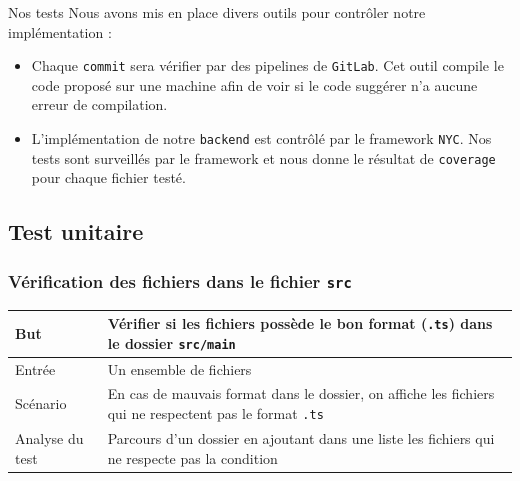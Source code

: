 \newenvironment{mytest}[4]
{
    \begin{center}
        \centering
        \begin{tabular}[h]{|m{4cm}|m{12cm}|}
            \hline
            \rowcolor[HTML]{F8B400}
            \textbf{But}    & #1 \\
            \hline
            \hline
            \rowcolor[HTML]{F7F7F7}
            Entrée          & #2 \\
            \hline
            \rowcolor[HTML]{F7F7F7}
            Scénario        & #3 \\
            \hline
            \rowcolor[HTML]{F7F7F7}
            Analyse du test & #4 \\
            \hline
        \end{tabular}
    \end{center}
}

\section{Nos tests}
Nous avons mis en place divers outils pour contrôler notre implémentation :
\begin{itemize}
    \item Chaque {\tt commit} sera vérifier par des pipelines de {\tt GitLab}. Cet outil compile le code proposé sur une machine afin de voir si le code suggérer n'a aucune erreur de compilation.
    \item L'implémentation de notre {\tt backend} est contrôlé par le framework {\tt NYC}. Nos tests sont surveillés par le framework et nous donne le résultat de {\tt coverage} pour chaque fichier testé.
\end{itemize}

\subsection{Test unitaire}

\subsubsection{Vérification des fichiers dans le fichier {\tt src}}

\mytest
{Vérifier si les fichiers possède le bon format (\texttt{.ts}) dans le dossier \texttt{src/main}}
{Un ensemble de fichiers}
{En cas de mauvais format dans le dossier, on affiche les fichiers qui ne respectent pas le format \texttt{.ts}}
{Parcours d'un dossier en ajoutant dans une liste les fichiers qui ne respecte pas la condition}

